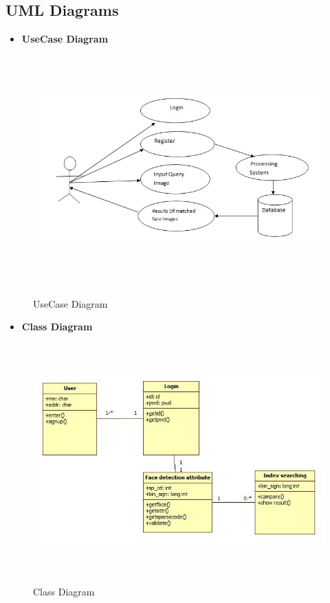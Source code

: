 \subsection{UML Diagrams}
\begin{itemize}
\item \textbf {UseCase Diagram}
\end{itemize}

\begin{figure}[ht!]
	\centering
\includegraphics[height=250pt,width=435pt]{usecase.jpg}\\
\caption{UseCase Diagram}
\end{figure}

\newpage
\begin{itemize}
\item \textbf {Class Diagram}
\end{itemize}

\begin{figure}[ht!]
	\centering
\includegraphics[height=250pt,width=435pt]{class1.jpg}\\
\caption{Class Diagram}
\end{figure}

